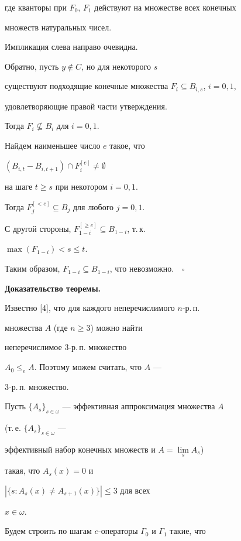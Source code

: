 где кванторы при $F_0$, $F_1$ действуют на множестве всех конечных


множеств натуральных чисел.





Импликация слева направо очевидна.


Обратно, пусть $y\notin C$, но для некоторого $s$


существуют подходящие конечные множества $F_i\subseteq B_{i,s}$, $i=0,1$,


удовлетворяющие правой части утверждения.


Тогда $F_i\not\subseteq B_i$ для $i=0,1$.


Найдем наименьшее число $e$ такое, что


$(B_{i,t}-B_{i,t+1})\cap F_i^{[e]}\ne\emptyset$


на шаге $t\ge s$ при некотором $i=0,1$.


Тогда $F_j^{[<e]}\subseteq B_j$ для любого $j=0,1$.


С другой стороны, $F_{1-i}^{[\ge e]}\subseteq B_{1-i}$, т.\,к.


$\max(F_{1-i})<s\le t$.


Таким образом, $F_{1-i}\subseteq B_{1-i}$, что невозможно.$\quad\square$


\medskip





{\bf Доказательство теоремы.}


Известно [4], что для каждого неперечислимого $n$-р.\,п.


множества $A$ (где $n\ge 3$) можно найти 


неперечислимое $3$-р.\,п. множество


$A_0\le_e A$. Поэтому можем считать, что $A$ ---


$3$-р.\,п. множество.





Пусть $\{A_s\}_{s\in\omega}$ --- эффективная аппроксимация множества $A$


(т.\,е. $\{A_s\}_{s\in\omega}$ ---


эффективный набор конечных множеств и $A=\lim\limits_s A_s$)


такая, что $A_s(x)=0$ и


$|\{s: A_s(x)\ne A_{s+1}(x)\}|\le 3$ для всех


$x\in\omega$.


Будем строить по шагам $e$-операторы $\Gamma_0$ и $\Gamma_1$ такие, что


